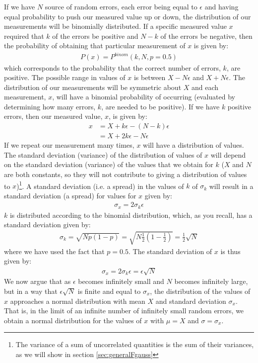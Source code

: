 If we have $N$ source of random errors, each error being equal to $\epsilon$ and having equal probability to push our measured value up or down, the distribution of our measurements will be binomially distributed. If a specific measured value $x$ required that $k$ of the errors be positive and $N-k$ of the errors be negative, then the probability of obtaining that particular measurement of $x$ is given by:
\begin{align*}
P(x)=P^{binom}(k,N,p=0.5)
\end{align*}
which corresponds to the probability that the correct number of errors, $k$, are positive. The possible range in values of $x$ is between $X-N\epsilon$ and $X+N\epsilon$. The distribution of our measurements will be symmetric about $X$ and each measurement, $x$, will have a binomial probability of occurring (evaluated by determining how many errors, $k$, are needed to be positive). If we have $k$ positive errors, then our measured value, $x$, is given by:
\begin{align}
x&=X+k\epsilon-(N-k)\epsilon\\
&=X+2k\epsilon-N\epsilon
\end{align}
If we repeat our measurement many times, $x$ will have a distribution of values. The standard deviation (variance) of the distribution of values of $x$ will depend on the standard deviation (variance) of the values that we obtain for $k$ ($X$ and $N$ are both constants, so they will not contribute to giving a distribution of values to $x$)\footnote{The variance of a sum of uncorrelated quantities is the sum of their variances, as we will show in section \ref{sec:generalFgauss}}. A standard deviation (i.e. a spread) in the values of $k$ of $\sigma_k$ will result in a standard deviation (a spread) for values for $x$ given by:
\begin{align}
\sigma_x=2 \sigma_k \epsilon
\end{align}
$k$ is distributed according to the binomial distribution, which, as you recall, has a standard deviation given by:
\begin{align}
\sigma_k=\sqrt{Np(1-p)}=\sqrt{N\frac{1}{2}(1-\frac{1}{2})}=\frac{1}{2}\sqrt{N}
\end{align}
where we have used the fact that $p=0.5$. The standard deviation of $x$ is thus given by:
\begin{align}
\sigma_x=2 \sigma_k \epsilon=\epsilon\sqrt{N}
\end{align}
We now argue that as $\epsilon$ becomes infinitely small and $N$ becomes infinitely large, but in a way that $\epsilon\sqrt{N}$ is finite and equal to $\sigma_x$, the distribution of the values of $x$ approaches a normal distribution with mean $X$ and standard deviation $\sigma_x$. That is, in the limit of an infinite number of infinitely small random errors, we obtain a normal distribution for the values of $x$ with $\mu=X$ and $\sigma=\sigma_x$. 


